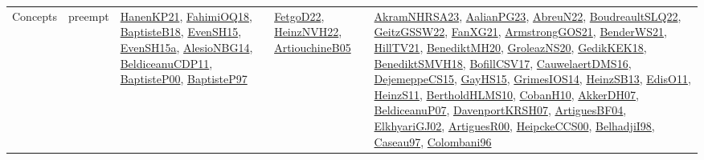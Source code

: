 {\begin{longtable}{lp{3cm}>{\raggedright}p{6cm}>{\raggedright}p{6cm}p{8cm}}
Concepts & preempt & \href{papers/HanenKP21.pdf}{HanenKP21}\cite{HanenKP21}, \href{articles/FahimiOQ18.pdf}{FahimiOQ18}\cite{FahimiOQ18}, \href{articles/BaptisteB18.pdf}{BaptisteB18}\cite{BaptisteB18}, \href{papers/EvenSH15.pdf}{EvenSH15}\cite{EvenSH15}, \href{articles/EvenSH15a.pdf}{EvenSH15a}\cite{EvenSH15a}, \href{papers/AlesioNBG14.pdf}{AlesioNBG14}\cite{AlesioNBG14}, \href{articles/BeldiceanuCDP11.pdf}{BeldiceanuCDP11}\cite{BeldiceanuCDP11}, \href{articles/BaptisteP00.pdf}{BaptisteP00}\cite{BaptisteP00}, \href{papers/BaptisteP97.pdf}{BaptisteP97}\cite{BaptisteP97} & \href{articles/FetgoD22.pdf}{FetgoD22}\cite{FetgoD22}, \href{articles/HeinzNVH22.pdf}{HeinzNVH22}\cite{HeinzNVH22}, \href{papers/ArtiouchineB05.pdf}{ArtiouchineB05}\cite{ArtiouchineB05} & \href{articles/AkramNHRSA23.pdf}{AkramNHRSA23}\cite{AkramNHRSA23}, \href{papers/AalianPG23.pdf}{AalianPG23}\cite{AalianPG23}, \href{articles/AbreuN22.pdf}{AbreuN22}\cite{AbreuN22}, \href{papers/BoudreaultSLQ22.pdf}{BoudreaultSLQ22}\cite{BoudreaultSLQ22}, \href{papers/GeitzGSSW22.pdf}{GeitzGSSW22}\cite{GeitzGSSW22}, \href{articles/FanXG21.pdf}{FanXG21}\cite{FanXG21}, \href{papers/ArmstrongGOS21.pdf}{ArmstrongGOS21}\cite{ArmstrongGOS21}, \href{papers/BenderWS21.pdf}{BenderWS21}\cite{BenderWS21}, \href{papers/HillTV21.pdf}{HillTV21}\cite{HillTV21}, \href{articles/BenediktMH20.pdf}{BenediktMH20}\cite{BenediktMH20}, \href{papers/GroleazNS20.pdf}{GroleazNS20}\cite{GroleazNS20}, \href{articles/GedikKEK18.pdf}{GedikKEK18}\cite{GedikKEK18}, \href{papers/BenediktSMVH18.pdf}{BenediktSMVH18}\cite{BenediktSMVH18}, \href{papers/BofillCSV17.pdf}{BofillCSV17}\cite{BofillCSV17}, \href{papers/CauwelaertDMS16.pdf}{CauwelaertDMS16}\cite{CauwelaertDMS16}, \href{papers/DejemeppeCS15.pdf}{DejemeppeCS15}\cite{DejemeppeCS15}, \href{papers/GayHS15.pdf}{GayHS15}\cite{GayHS15}, \href{articles/GrimesIOS14.pdf}{GrimesIOS14}\cite{GrimesIOS14}, \href{articles/HeinzSB13.pdf}{HeinzSB13}\cite{HeinzSB13}, \href{papers/EdisO11.pdf}{EdisO11}\cite{EdisO11}, \href{papers/HeinzS11.pdf}{HeinzS11}\cite{HeinzS11}, \href{papers/BertholdHLMS10.pdf}{BertholdHLMS10}\cite{BertholdHLMS10}, \href{papers/CobanH10.pdf}{CobanH10}\cite{CobanH10}, \href{papers/AkkerDH07.pdf}{AkkerDH07}\cite{AkkerDH07}, \href{papers/BeldiceanuP07.pdf}{BeldiceanuP07}\cite{BeldiceanuP07}, \href{papers/DavenportKRSH07.pdf}{DavenportKRSH07}\cite{DavenportKRSH07}, \href{papers/ArtiguesBF04.pdf}{ArtiguesBF04}\cite{ArtiguesBF04}, \href{papers/ElkhyariGJ02.pdf}{ElkhyariGJ02}\cite{ElkhyariGJ02}, \href{articles/ArtiguesR00.pdf}{ArtiguesR00}\cite{ArtiguesR00}, \href{articles/HeipckeCCS00.pdf}{HeipckeCCS00}\cite{HeipckeCCS00}, \href{articles/BelhadjiI98.pdf}{BelhadjiI98}\cite{BelhadjiI98}, \href{papers/Caseau97.pdf}{Caseau97}\cite{Caseau97}, \href{papers/Colombani96.pdf}{Colombani96}\cite{Colombani96}\\

\end{longtable}}
